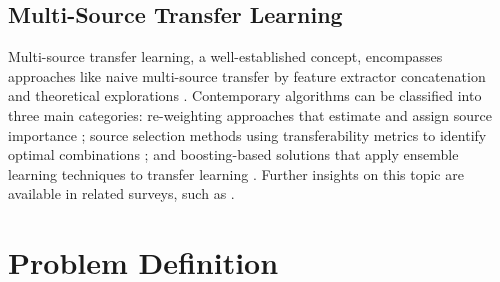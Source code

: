 \documentclass[letterpaper]{article} %
\begin{document}


\subsection{Multi-Source Transfer Learning}\label{sec:multisource}



Multi-source transfer learning, a well-established concept, encompasses approaches like naive multi-source transfer by feature extractor concatenation \citep{christodoulidis2016multisource} and theoretical explorations \citep{crammer2008learning, mansour2008domain, ben2010theory, tong2021mathematical, chen2023algorithm}. Contemporary algorithms can be classified into three main categories: re-weighting approaches that estimate and assign source importance \citep{sun2011two, lee2019learning, shui2021aggregating}; source selection methods using transferability metrics to identify optimal combinations \citep{agostinelli2022transferability}; and boosting-based solutions that apply ensemble learning techniques to transfer learning \citep{huang2012boosting, xu2012multi, fang2019adapted}. Further insights on this topic are available in related surveys, such as \citep{sun2015survey}.

\section{Problem Definition}
\end{document}
